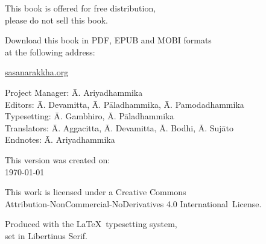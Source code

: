 \cleartoverso
\thispagestyle{empty}

\vspace*{-\baselineskip}

{%

\fontsize{9}{11}\selectfont
\centering
\setlength{\parindent}{0pt}%
\setlength{\parskip}{0.8\baselineskip}%


This book is offered for free distribution,\\
please do not sell this book.

Download this book in PDF, EPUB and MOBI formats\\
at the following address:

\href{https://sasanarakkha.org/}{sasanarakkha.org}

\vfill


Project Manager: Ā. Ariyadhammika\\
Editors: Ā. Devamitta, Ā. Pāladhammika, Ā. Pamodadhammika\\
Typesetting: Ā. Gambhiro, Ā. Pāladhammika\\
Translators: Ā. Aggacitta, Ā. Devamitta, Ā. Bodhi, Ā. Sujāto\\
Endnotes: Ā. Ariyadhammika


\vfill

This version was created on:\\
\today\\
\currenttime

\vfill

This work is licensed under a Creative Commons\\
Attribution-NonCommercial-NoDerivatives 4.0 International~License.

Produced with the \LaTeX\ typesetting system,\\
set in Libertinus Serif.

\theEditionInfo

}
